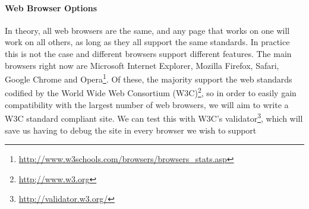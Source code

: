 \paragraph{Web Browser Options}
In theory, all web browsers are the same, and any page that works on one will work on all others, as long as they all support the same standards. In practice this is not the case and different browsers support different features. The main browsers right now are Microsoft Internet Explorer, Mozilla Firefox, Safari, Google Chrome and Opera\footnote{\url{http://www.w3schools.com/browsers/browsers_stats.asp}}. Of these, the majority support the web standards codified by the World Wide Web Consortium (W3C)\footnote{\url{http;//www.w3.org}}, so in order to easily gain compatibility with the largest number of web browsers, we will aim to write a W3C standard compliant site. We can test this with W3C's validator\footnote{\url{http://validator.w3.org/}}, which will save us having to debug the site in every browser we wish to support





























